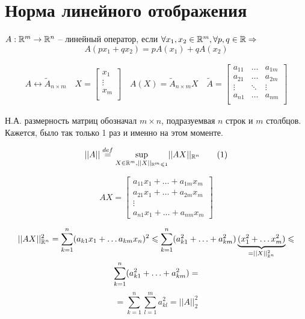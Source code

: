 \documentclass[main]{subfiles}
\begin{document}
\chapter{Норма линейного отображения}
\begin{definition}
    $A: {\mathbb{R}}^m \rightarrow {\mathbb{R}}^n$ -- линейный оператор, если
    $ \forall x_1, x_2 \in {\mathbb{R}}^m, \forall p, q \in {\mathbb{R}} \Rightarrow$
    \[A(px_1 + qx_2) = pA(x_1) + qA(x_2)\]
\end{definition}
\begin{gather*}
    A \leftrightarrow \tilde{A}_{n \times m} \quad
    X =
        \begin{bmatrix}
            x_1 \\
            \vdots \\
            x_m  \\
        \end{bmatrix} \quad 
    A(X) = \tilde{A}_{n \times m} X \quad
    \tilde{A} = 
    \begin{bmatrix}
        a_{11} & \ldots & a_{1m} \\
        a_{21} & \ldots & a_{2m} \\
        \vdots & \ddots & \vdots \\
        a_{n1} & \ldots & a_{nm} \\
    \end{bmatrix}
\end{gather*}

\begin{remark}
    Н.А. размерность матриц обозначал $m \times n$, подразуемвая $n$ строк и $m$ столбцов.
    Кажется, было так только 1 раз и именно на этом моменте.
\end{remark}

\begin{definition}
    \[||A|| \stackrel{def}{=} \underset{X \in {\mathbb{R}}^m, ||X||_{{\mathbb{R}}^m \leqslant 1}}{\sup}
     {||AX||_{{\mathbb{R}}^n}} \tag{1} \]
\end{definition}


\[AX = \begin{bmatrix}
    a_{11}x_1 + \ldots + a_{1m}x_m \\
    a_{21}x_1 + \ldots + a_{2m}x_m \\
    \vdots \\
    a_{n1}x_1 + \ldots + a_{nm}x_m
\end{bmatrix}\]



\begin{multline*}
    ||AX||^2_{{\mathbb{R}}^n} = \sum_{k=1}^n(a_{k1}x_1 + \ldots a_{km}x_n)^2 \leqslant 
    \sum_{k=1}^n (a^2_{k1} + \ldots + a^2_{km})\underbrace{(x_1^2 + \ldots x_m^2)}_{=||X||^2_{{\mathbb{R}}^n}} \leqslant \\
    \sum_{k=1}^n (a^2_{k1} + \ldots + a^2_{km}) =
\end{multline*}
     \[=\sum_{k=1}^n \sum_{l=1}^m a_{kl}^2 =||A||_2^2  \tag{2}\]
\end{document}
